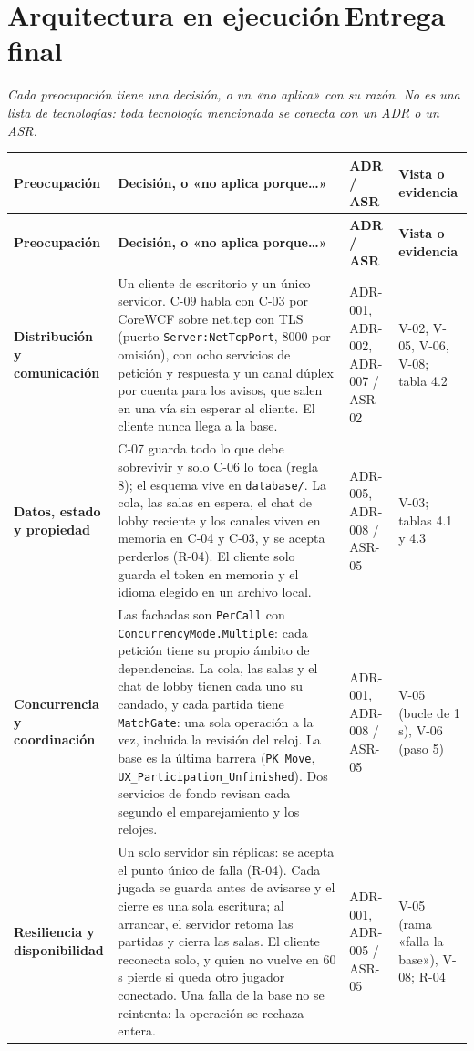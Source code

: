 \documentclass[11pt,letterpaper]{article}
\newcommand{\hint}[1]{{\itshape\color{black!70}#1}\par} %
\newcommand{\greenbadge}[1]{\hspace{0.4em}\colorbox{SADGreenBg}{\scriptsize\bfseries\color{SADGreen}\,#1\,}}
\newcommand{\hd}[1]{\textbf{\small #1}}
\newcommand{\headrow}{\rowcolor{SADHead}}
\begin{document}
\section{Arquitectura en ejecución\greenbadge{Entrega final}}
\hint{Cada preocupación tiene una decisión, o un «no aplica» con su razón. No es una lista de tecnologías: toda tecnología mencionada se conecta con un ADR o un ASR.}
\begin{xltabular}{\linewidth}{|>{\raggedright\arraybackslash}p{3.4cm}|Y|>{\small\raggedright\arraybackslash}p{2.4cm}|>{\small\raggedright\arraybackslash}p{2.6cm}|}\hline
  \headrow\hd{Preocupación} & \hd{Decisión, o «no aplica porque…»} & \hd{ADR / ASR} & \hd{Vista o evidencia}\\\hline
  \endfirsthead
  \headrow\hd{Preocupación} & \hd{Decisión, o «no aplica porque…»} & \hd{ADR / ASR} & \hd{Vista o evidencia}\\\hline
  \endhead
  \small\bfseries Distribución y comunicación & Un cliente de escritorio y un único servidor. C-09 habla con C-03 por CoreWCF sobre net.tcp con TLS (puerto \texttt{Server:\allowbreak NetTcpPort}, 8000 por omisión), con ocho servicios de petición y respuesta y un canal dúplex por cuenta para los avisos, que salen en una vía sin esperar al cliente. El cliente nunca llega a la base. & ADR-001, ADR-002, ADR-007 / ASR-02 & V-02, V-05, V-06, V-08; tabla 4.2\\\hline
  \small\bfseries Datos, estado y propiedad & C-07 guarda todo lo que debe sobrevivir y solo C-06 lo toca (regla 8); el esquema vive en \texttt{database/}. La cola, las salas en espera, el chat de lobby reciente y los canales viven en memoria en C-04 y C-03, y se acepta perderlos (R-04). El cliente solo guarda el token en memoria y el idioma elegido en un archivo local. & ADR-005, ADR-008 / ASR-05 & V-03; tablas 4.1 y 4.3\\\hline
  \small\bfseries Concurrencia y coordinación & Las fachadas son \texttt{PerCall} con \texttt{ConcurrencyMode.\allowbreak Multiple}: cada petición tiene su propio ámbito de dependencias. La cola, las salas y el chat de lobby tienen cada uno su candado, y cada partida tiene \texttt{MatchGate}: una sola operación a la vez, incluida la revisión del reloj. La base es la última barrera (\texttt{PK\_Move}, \texttt{UX\_Participation\_\allowbreak Unfinished}). Dos servicios de fondo revisan cada segundo el emparejamiento y los relojes. & ADR-001, ADR-008 / ASR-05 & V-05 (bucle de 1 s), V-06 (paso 5)\\\hline
  \small\bfseries Resiliencia y disponibilidad & Un solo servidor sin réplicas: se acepta el punto único de falla (R-04). Cada jugada se guarda antes de avisarse y el cierre es una sola escritura; al arrancar, el servidor retoma las partidas y cierra las salas. El cliente reconecta solo, y quien no vuelve en 60 s pierde si queda otro jugador conectado. Una falla de la base no se reintenta: la operación se rechaza entera. & ADR-001, ADR-005 / ASR-05 & V-05 (rama «falla la base»), V-08; R-04\\\hline

\end{xltabular}
\end{document}
